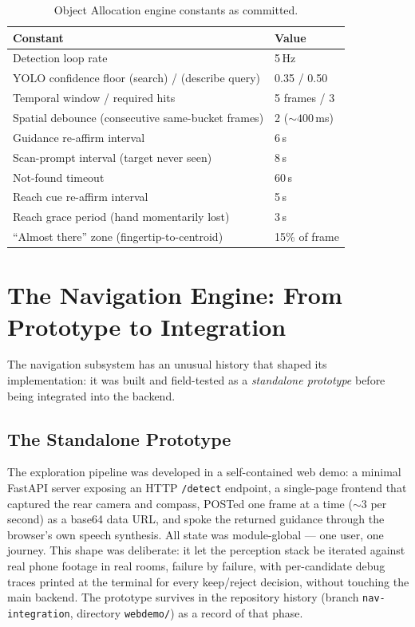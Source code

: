 \begin{table}[!htbp]
\centering
\caption[Object Allocation tuning constants]{Object Allocation engine constants as committed.}
\label{tab:oa_constants}
\small
\begin{tabular}{p{7.8cm} l}
\toprule
\textbf{Constant} & \textbf{Value} \\
\midrule
Detection loop rate & 5\,Hz \\
YOLO confidence floor (search) / (describe query) & 0.35 / 0.50 \\
Temporal window / required hits & 5 frames / 3 \\
Spatial debounce (consecutive same-bucket frames) & 2 (${\sim}400$\,ms) \\
Guidance re-affirm interval & 6\,s \\
Scan-prompt interval (target never seen) & 8\,s \\
Not-found timeout & 60\,s \\
Reach cue re-affirm interval & 5\,s \\
Reach grace period (hand momentarily lost) & 3\,s \\
``Almost there'' zone (fingertip-to-centroid) & 15\% of frame \\
\bottomrule
\end{tabular}
\end{table}

\section{The Navigation Engine: From Prototype to Integration}
\label{sec:nav_engine}

The navigation subsystem has an unusual history that shaped its implementation:
it was built and field-tested as a \emph{standalone prototype} before being
integrated into the backend.

\subsection{The Standalone Prototype}

The exploration pipeline was developed in a self-contained web demo: a minimal
FastAPI server exposing an HTTP \texttt{/detect} endpoint, a single-page frontend
that captured the rear camera and compass, POSTed one frame at a time (${\sim}3$
per second) as a base64 data URL, and spoke the returned guidance through the
browser's own speech synthesis. All state was module-global --- one user, one
journey. This shape was deliberate: it let the perception stack be iterated
against real phone footage in real rooms, failure by failure, with per-candidate
debug traces printed at the terminal for every keep/reject decision, without
touching the main backend. The prototype survives in the repository history
(branch \texttt{nav-integration}, directory \texttt{webdemo/}) as a record of
that phase.

